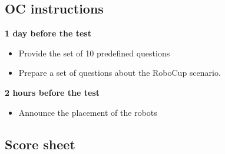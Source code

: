\subsection{OC instructions}

\textbf{1 day before the test}
\begin{itemize}
\item Provide the set of 10 predefined questions
\item Prepare a set of questions about the RoboCup scenario. 
\end{itemize}
\textbf{2 hours before the test}
\begin{itemize}
\item Announce the placement of the robots
\end{itemize}

\subsection{Score sheet}


